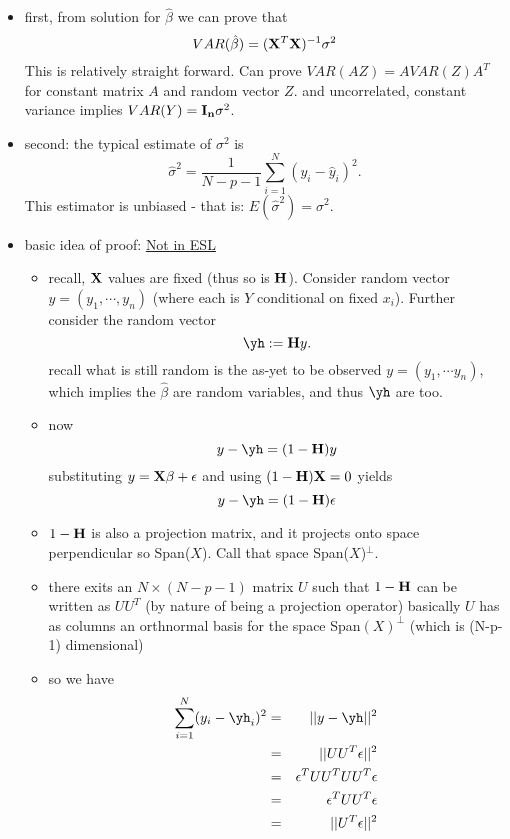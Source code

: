 \begin{itemize}
  \item first, from solution for ${\hat{\beta}}$ we can prove that
    $$ VAR(\hat{\beta})  = ({\bf X}^T{\bf X})^{-1} \sigma^2 $$
  	\subitem This is relatively straight forward. Can prove $VAR(AZ) = A VAR(Z) A^T$ for constant matrix $A$ and random vector $Z$.
	\subitem and uncorrelated, constant variance implies $VAR(Y) = {\bf I_n} \sigma^2$.
   \item second: the typical estimate of $\sigma^2$ is
     $$ \hat{\sigma}^2 = \frac{1}{N - p - 1} \sum_{i=1}^N (y_i - \hat{y}_i)^2. $$
     This estimator is unbiased - that is: $E(\hat{\sigma}^2) = \sigma^2$.
   \item basic idea of proof: \underline{Not in ESL}
     \begin{itemize}
       \item recall, ${\bf X}$ values are fixed (thus so is ${\bf H}$). Consider random vector $y = (y_1,\cdots,y_n)$ (where each is $Y$ conditional on fixed $x_i$). Further consider the random vector
	 $$ \yh := {\bf H} y. $$
	 \subitem recall what is still random is the as-yet to be observed $y = (y_1, \cdots y_n)$, which implies the $\hat{\beta}$ are random variables, and thus $\yh$ are too.
       \item now
	 $$  y -  \yh =  (1 - {\bf H})y $$
	 substituting $y = {\bf X}\beta + \epsilon$ and using $(1-{\bf H)X} = 0$ yields
	 $$ y - \yh = (1 - {\bf H})\epsilon $$
       \item $ 1 -{\bf H}$ is also a projection matrix, and it projects onto space perpendicular so Span($X$). Call that space Span($X$)${}^\perp$.
       \item there exits an $N\times (N-p-1)$ matrix $U$ such that $1 - {\bf H}$ can be written as $UU^T$ (by nature of being a projection operator)
	 \subitem basically $U$ has as columns an orthnormal basis for the space Span$(X)^\perp$ (which is (N-p-1) dimensional)
       \item so we have
	 \begin{eqnarray}
	   \sum_{i=1}^N (y_i - \yh_i)^2 &=& || y -\yh ||^2  \\
	   	&=& || UU^T\epsilon ||^2 \\
		&=& \epsilon^TUU^TUU^T \epsilon \\
		&=& \epsilon^T UU^T \epsilon \\
	      	&=& || U^T\epsilon ||^2	

\end{eqnarray}
\end{itemize}
\end{itemize}
